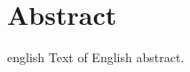\chapter*{Abstract}

\begin{otherlanguage*}{english}
Text of English abstract.
\end{otherlanguage*}
